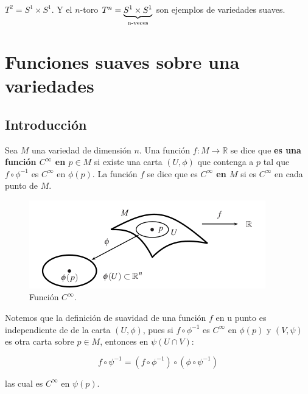 \documentclass[12pt]{report}
\theoremstyle{largebreak}
\begin{document}
    \begin{exa}
        $T^2=S^1\times S^1$. Y el $n$-toro $T^n=\underbrace{S^1\times S^1}_{\textup{n-veces}}$ son ejemplos de variedades suaves.
    \end{exa}

    \setcounter{chapter}{5}

    \chapter{Funciones suaves sobre una variedades}

    \section{Introducción}

    \begin{mydef}
        Sea $M$ una variedad de dimensión $n$. Una función $f:M\rightarrow \mathbb{R}$ se dice que \textbf{es una función $C^\infty$ en $p\in M$} si existe una carta $(U,\phi)$ que contenga a $p$ tal que $f\circ \phi^{-1}$ es $C^\infty$ en $\phi(p)$. La función $f$ se dice que es \textbf{$C^\infty$ en $M$} si es $C^\infty$ en cada punto de $M$.
    \end{mydef}

    \begin{figure}
        \includegraphics[scale = 0.75]{f_suaves.png}
        \centering
        \caption{Función $C^\infty$.}
    \end{figure}

    Notemos que la definición de suavidad de una función $f$ en u punto es independiente de de la carta $(U,\phi)$, pues si $f\circ \phi^{-1}$ es $C^\infty$ en $\phi(p)$ y $(V,\psi)$ es otra carta sobre $p\in M$, entonces en $\psi(U\cap V)$:

    \begin{equation*}
        f\circ \psi^{-1}=(f\circ\phi^{-1})\circ(\phi\circ\psi^{-1})
    \end{equation*}

    las cual es $C^\infty$ en $\psi(p)$.
\end{document}
